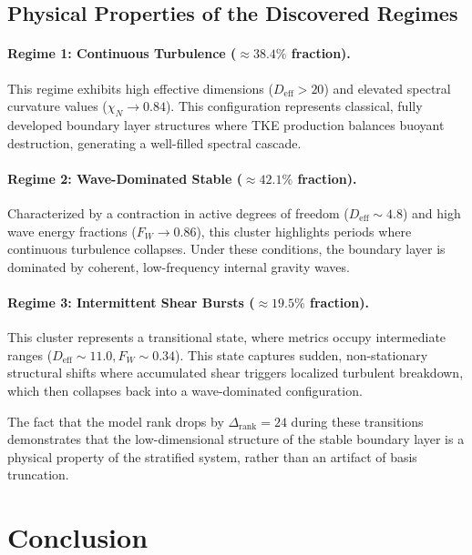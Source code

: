 \subsection{Physical Properties of the Discovered Regimes}

\paragraph{Regime 1: Continuous Turbulence ($\approx 38.4\%$ fraction).}
This regime exhibits high effective dimensions ($D_{\mathrm{eff}} > 20$) and elevated spectral curvature values ($\chi_N \to 0.84$). This configuration represents classical, fully developed boundary layer structures where TKE production balances buoyant destruction, generating a well-filled spectral cascade.

\paragraph{Regime 2: Wave-Dominated Stable ($\approx 42.1\%$ fraction).}
Characterized by a contraction in active degrees of freedom ($D_{\mathrm{eff}} \sim 4.8$) and high wave energy fractions ($F_W \to 0.86$), this cluster highlights periods where continuous turbulence collapses. Under these conditions, the boundary layer is dominated by coherent, low-frequency internal gravity waves.

\paragraph{Regime 3: Intermittent Shear Bursts ($\approx 19.5\%$ fraction).}
This cluster represents a transitional state, where metrics occupy intermediate ranges ($D_{\mathrm{eff}} \sim 11.0, F_W \sim 0.34$). This state captures sudden, non-stationary structural shifts where accumulated shear triggers localized turbulent breakdown, which then collapses back into a wave-dominated configuration.

The fact that the model rank drops by $\Delta_{\mathrm{rank}} = 24$ during these transitions demonstrates that the low-dimensional structure of the stable boundary layer is a physical property of the stratified system, rather than an artifact of basis truncation.

\section{Conclusion}
\label{sec:conclusion}

